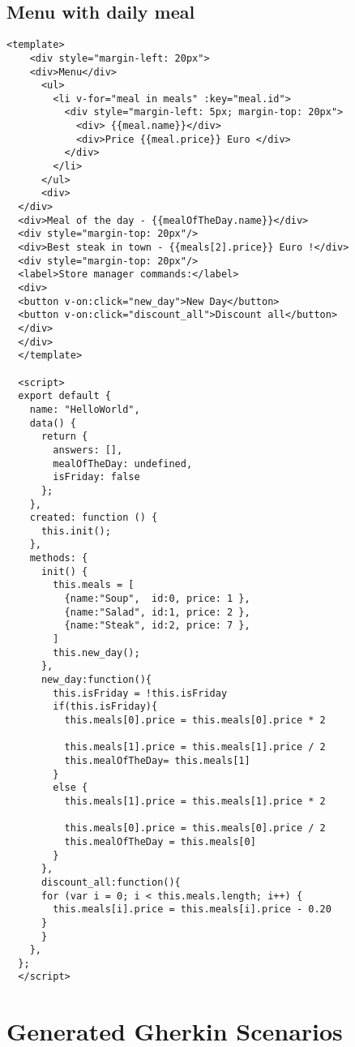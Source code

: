 \subsection{Menu with daily meal}
\label{appendix:daily_menu_source_code}
\begin{lstlisting}[style=vue]
<template>
    <div style="margin-left: 20px">
    <div>Menu</div>
      <ul>
        <li v-for="meal in meals" :key="meal.id">
          <div style="margin-left: 5px; margin-top: 20px">
            <div> {{meal.name}}</div> 
            <div>Price {{meal.price}} Euro </div>
          </div>
        </li>
      </ul>
      <div>
  </div>
  <div>Meal of the day - {{mealOfTheDay.name}}</div>
  <div style="margin-top: 20px"/>
  <div>Best steak in town - {{meals[2].price}} Euro !</div>
  <div style="margin-top: 20px"/>
  <label>Store manager commands:</label>
  <div>
  <button v-on:click="new_day">New Day</button>
  <button v-on:click="discount_all">Discount all</button>
  </div>
  </div>
  </template>
  
  <script>
  export default {
    name: "HelloWorld",
    data() {
      return {
        answers: [],
        mealOfTheDay: undefined,
        isFriday: false
      };
    },
    created: function () {
      this.init();
    },
    methods: {
      init() {
        this.meals = [
          {name:"Soup",  id:0, price: 1 },
          {name:"Salad", id:1, price: 2 },
          {name:"Steak", id:2, price: 7 },
        ]
        this.new_day();
      },
      new_day:function(){
        this.isFriday = !this.isFriday
        if(this.isFriday){
          this.meals[0].price = this.meals[0].price * 2
  
          this.meals[1].price = this.meals[1].price / 2
          this.mealOfTheDay= this.meals[1]
        }
        else {
          this.meals[1].price = this.meals[1].price * 2
  
          this.meals[0].price = this.meals[0].price / 2
          this.mealOfTheDay = this.meals[0]
        }
      },
      discount_all:function(){
      for (var i = 0; i < this.meals.length; i++) {
        this.meals[i].price = this.meals[i].price - 0.20 
      } 
      }
    },
  };
  </script>
\end{lstlisting}

\section{Generated Gherkin Scenarios}
